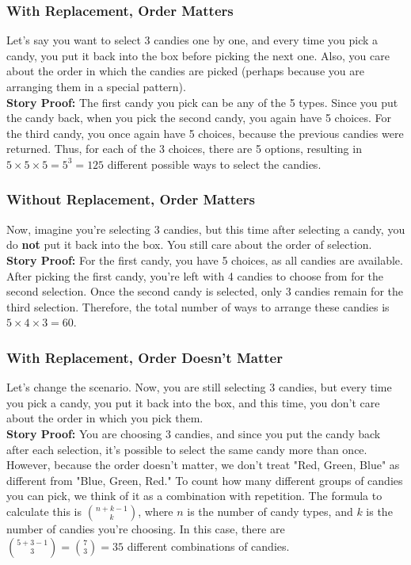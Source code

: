 \subsubsection*{With Replacement, Order Matters}
Let's say you want to select 3 candies one by one, and every time you pick a candy, you put it back into the box before picking the next one. Also, you care about the order in which the candies are picked (perhaps because you are arranging them in a special pattern). \\

\textbf{Story Proof:} The first candy you pick can be any of the 5 types. Since you put the candy back, when you pick the second candy, you again have 5 choices. For the third candy, you once again have 5 choices, because the previous candies were returned. Thus, for each of the 3 choices, there are 5 options, resulting in \( 5 \times 5 \times 5 = 5^3 = 125 \) different possible ways to select the candies.

\subsubsection*{Without Replacement, Order Matters}

Now, imagine you're selecting 3 candies, but this time after selecting a candy, you do \textbf{not} put it back into the box. You still care about the order of selection. \\

\textbf{Story Proof:} For the first candy, you have 5 choices, as all candies are available. After picking the first candy, you're left with 4 candies to choose from for the second selection. Once the second candy is selected, only 3 candies remain for the third selection. Therefore, the total number of ways to arrange these candies is \( 5 \times 4 \times 3 = 60 \). 

\subsubsection*{With Replacement, Order Doesn't Matter}

Let's change the scenario. Now, you are still selecting 3 candies, but every time you pick a candy, you put it back into the box, and this time, you don’t care about the order in which you pick them.\\

\textbf{Story Proof:} You are choosing 3 candies, and since you put the candy back after each selection, it’s possible to select the same candy more than once. However, because the order doesn’t matter, we don't treat "Red, Green, Blue" as different from "Blue, Green, Red." To count how many different groups of candies you can pick, we think of it as a combination with repetition. The formula to calculate this is \( \binom{n+k-1}{k} \), where \( n \) is the number of candy types, and \( k \) is the number of candies you’re choosing. In this case, there are \( \binom{5+3-1}{3} = \binom{7}{3} = 35 \) different combinations of candies.

